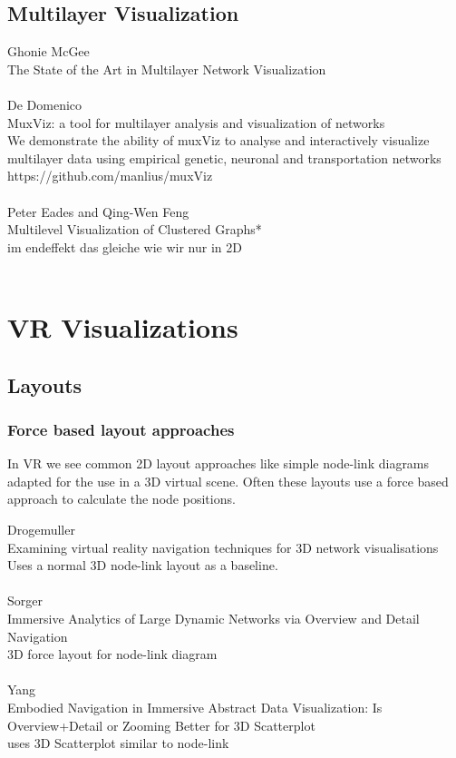 \subsection{Multilayer Visualization}
Ghonie McGee\\
The State of the Art in Multilayer Network Visualization\\
\\
De Domenico\\
MuxViz: a tool for multilayer analysis and visualization of networks\\
We demonstrate the ability of muxViz to analyse and interactively visualize multilayer data using empirical genetic, neuronal and transportation networks https://github.com/manlius/muxViz\\
\\
Peter Eades and Qing-Wen Feng\\
Multilevel Visualization of Clustered Graphs*\\
im endeffekt das gleiche wie wir nur in 2D\\
\\

\section{VR Visualizations}

\subsection{Layouts}

\subsubsection{Force based layout approaches}
In VR we see common 2D layout approaches like simple node-link diagrams adapted for the use in a 3D virtual scene. Often these layouts use a force based approach to calculate the node positions. 

Drogemuller\\
Examining virtual reality navigation techniques for 3D network visualisations\\
Uses a normal 3D node-link layout as a baseline.\\
\\
Sorger\\
Immersive Analytics of Large Dynamic Networks via Overview and Detail Navigation\\
3D force layout for node-link diagram\\
\\
Yang\\
Embodied Navigation in Immersive Abstract Data Visualization:
Is Overview+Detail or Zooming Better for 3D Scatterplot\\
uses 3D Scatterplot similar to node-link
